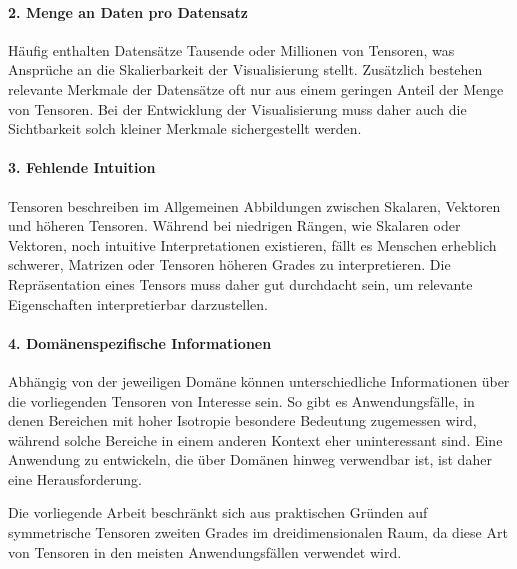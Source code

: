 \documentclass[a4paper,fontsize=12pt,toc=bib,parskip=half,ngerman]{scrartcl}
\begin{document}
\paragraph{2. Menge an Daten pro Datensatz}
H\"aufig enthalten Datens\"atze Tausende oder Millionen von Tensoren, was Anspr\"uche an die Skalierbarkeit der Visualisierung stellt. Zus\"atzlich bestehen relevante Merkmale der Datens\"atze oft nur aus einem geringen Anteil der Menge von Tensoren. Bei der Entwicklung der Visualisierung muss daher auch die Sichtbarkeit solch kleiner Merkmale sichergestellt werden.

\paragraph{3. Fehlende Intuition}
Tensoren beschreiben im Allgemeinen Abbildungen zwischen Skalaren, Vektoren und h\"oheren Tensoren. W\"ahrend bei niedrigen R\"angen, wie Skalaren oder Vektoren, noch intuitive Interpretationen existieren, f\"allt es Menschen erheblich schwerer, Matrizen oder Tensoren h\"oheren Grades zu interpretieren. Die Repr\"asentation eines Tensors muss daher gut durchdacht sein, um relevante Eigenschaften interpretierbar darzustellen.

\paragraph{4. Dom\"anenspezifische Informationen}
Abh\"angig von der jeweiligen Dom\"ane k\"onnen unterschiedliche Informationen \"uber die vorliegenden Tensoren von Interesse sein.  So gibt es Anwendungsf\"alle, in denen Bereichen mit hoher Isotropie besondere Bedeutung zugemessen wird, w\"ahrend solche Bereiche in einem anderen Kontext eher uninteressant sind\cite[S.~4]{hlawitschka2014top}. Eine Anwendung zu entwickeln, die \"uber Dom\"anen hinweg verwendbar ist, ist daher eine Herausforderung.

Die vorliegende Arbeit beschr\"ankt sich aus praktischen Gr\"unden auf symmetrische Tensoren zweiten Grades im dreidimensionalen Raum, da diese Art von Tensoren in den meisten Anwendungsf\"allen verwendet wird.
\end{document}
